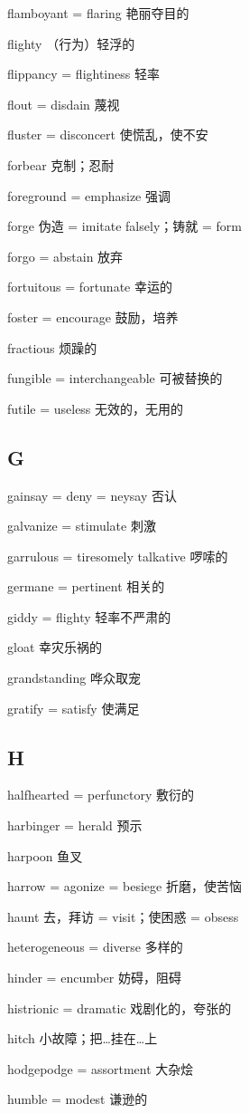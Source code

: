\documentclass[UTF8, fontset = none, zihao = -4, linespread = 1.1]{ctexart}
\begin{document}
\begin{multicols}{2}
flamboyant = flaring 艳丽夺目的

flighty （行为）轻浮的

flippancy = flightiness 轻率

flout = disdain 蔑视

fluster = disconcert 使慌乱，使不安

forbear 克制；忍耐

foreground = emphasize 强调

forge 伪造 = imitate falsely；铸就 = form

forgo = abstain 放弃

fortuitous = fortunate 幸运的

foster = encourage 鼓励，培养

fractious 烦躁的

fungible = interchangeable 可被替换的

futile = useless 无效的，无用的

\subsection*{G}
gainsay = deny = neysay 否认

galvanize = stimulate 刺激

garrulous = tiresomely talkative 啰嗦的

germane = pertinent 相关的

giddy = flighty 轻率不严肃的

gloat 幸灾乐祸的

grandstanding 哗众取宠

gratify = satisfy 使满足

\subsection*{H}
halfhearted = perfunctory 敷衍的

harbinger = herald 预示

harpoon 鱼叉

harrow = agonize = besiege 折磨，使苦恼

haunt 去，拜访 = visit；使困惑 = obsess

heterogeneous = diverse 多样的

hinder = encumber 妨碍，阻碍

histrionic = dramatic 戏剧化的，夸张的

hitch 小故障；把…挂在…上

hodgepodge = assortment 大杂烩

humble = modest 谦逊的


\end{multicols}
\end{document}
